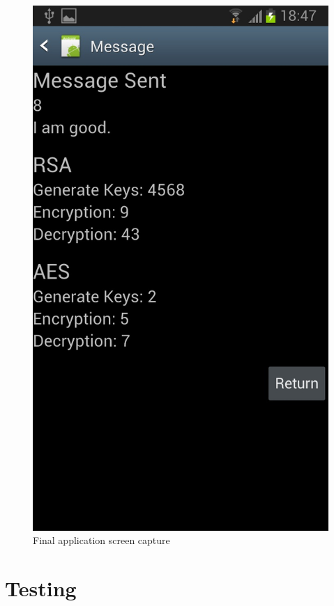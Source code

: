 \documentclass[a4paper,12pt]{report}
\begin{document}
\begin{figure}[htb]
 \centering
 \includegraphics[scale=0.25]{images/screenshots/app3.jpg}
 \caption{Final application screen capture}
 \label{fig:app3}
\end{figure}

\section{Testing}
\end{document}
